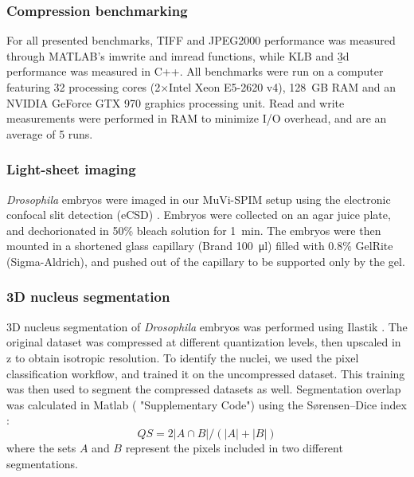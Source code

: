 \subsubsection{Compression benchmarking}
For all presented benchmarks, TIFF and JPEG2000 performance was measured through MATLAB's imwrite and imread functions, while KLB and \b3d performance was measured in C++. All benchmarks were run on a computer featuring 32 processing cores (2×Intel Xeon E5-2620 v4), \SI{128}{GB} RAM and an NVIDIA GeForce GTX 970 graphics processing unit. Read and write measurements were performed in RAM to minimize I/O overhead, and are an average of 5 runs.

\subsubsection{Light-sheet imaging}
\textit{Drosophila} embryos were imaged in our MuVi-SPIM setup \cite{krzic_multiview_2012} using the electronic confocal slit detection (eCSD) \cite{de_medeiros_confocal_2015}. Embryos were collected on an agar juice plate, and dechorionated in 50\% bleach solution for \SI{1}{min}. The embryos were then mounted in a shortened glass capillary (Brand \SI{100}{\micro l}) filled with 0.8\% GelRite (Sigma-Aldrich), and pushed out of the capillary to be supported only by the gel.

\subsubsection{3D nucleus segmentation}
3D nucleus segmentation of \textit{Drosophila} embryos was performed using Ilastik \cite{sommer_ilastik:_2011}. The original dataset was compressed at different quantization levels, then upscaled in z to obtain isotropic resolution. To identify the nuclei, we used the pixel classification workflow, and trained it on the uncompressed dataset. This training was then used to segment the compressed datasets as well. Segmentation overlap was calculated in Matlab ( "Supplementary Code") using the Sørensen–Dice index \cite{sorensen_method_1948,dice_measures_1945}:
\begin{equation}
  QS = 2 \left| A \cap B \right| / \left( |A| + |B| \right)
\end{equation}
where the sets $A$ and $B$ represent the pixels included in two different segmentations.

